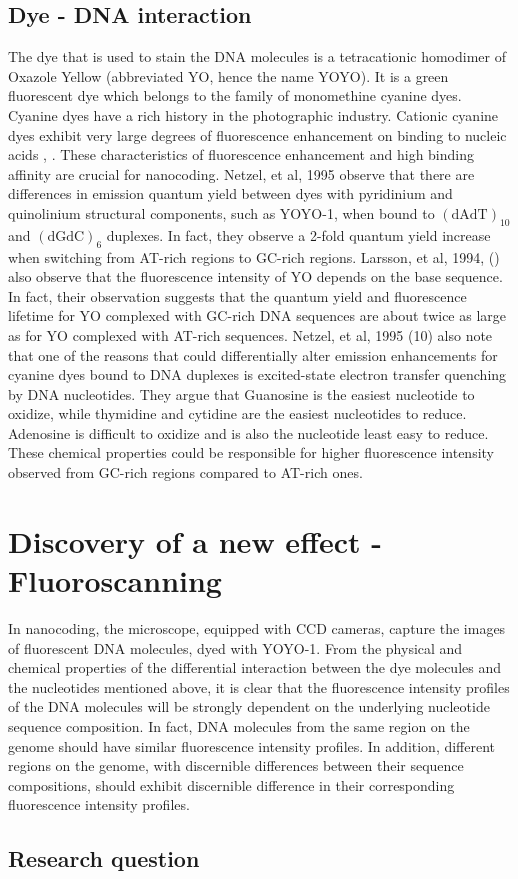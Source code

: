 \subsection*{Dye - DNA interaction} 
The dye that is used to stain the DNA molecules is a tetracationic homodimer of Oxazole Yellow (abbreviated YO, hence the name YOYO). It is a green fluorescent dye which belongs to the family of monomethine cyanine dyes. Cyanine dyes have a rich history in the photographic industry. Cationic  cyanine dyes  exhibit very large degrees of fluorescence enhancement on binding to nucleic acids \cite{Rye_etal_1992_NAR}, \cite{Lee_etal_1986_Cytometry}. These  characteristics of fluorescence enhancement and  high binding affinity are crucial for nanocoding. Netzel, et al, 1995 \cite{Netzel_etal_1995_JPC} observe that there are differences in emission quantum yield between dyes with pyridinium and quinolinium structural components, such as YOYO-1, when bound to $(\text{dAdT})_{10}$ and $(\text{dGdC})_6$ duplexes. In fact, they observe a 2-fold quantum yield increase when switching from AT-rich regions to GC-rich regions. Larsson, et al, 1994, (\cite{Larsson_etal_1994_JACS}) also observe that the fluorescence intensity of YO depends on the base sequence. In fact, their observation suggests that the quantum yield and fluorescence lifetime for YO complexed with GC-rich DNA sequences are about twice as large as for YO complexed with AT-rich sequences. Netzel, et al, 1995 (10) also note that one of the reasons that could differentially alter emission enhancements for cyanine dyes bound to DNA  duplexes is excited-state electron transfer quenching by DNA nucleotides. They argue that Guanosine is the easiest nucleotide to oxidize, while thymidine and cytidine are the easiest nucleotides to reduce. Adenosine is difficult to oxidize and is also the nucleotide least easy to reduce. These chemical properties could be responsible for higher fluorescence intensity observed from GC-rich regions compared to AT-rich ones. 

\section{Discovery of a new effect - Fluoroscanning}
In nanocoding, the microscope, equipped with CCD cameras, capture the images of fluorescent DNA molecules, dyed with YOYO-1. From the physical and chemical properties of the differential interaction between the dye molecules and the nucleotides mentioned above, it is clear that the fluorescence intensity profiles of the DNA molecules will be strongly dependent on the underlying nucleotide sequence composition. In fact, DNA molecules from the same region on the genome should have similar  fluorescence intensity profiles. In addition, different regions on the genome, with discernible differences between their sequence compositions, should exhibit discernible difference in their corresponding  fluorescence intensity profiles. \\

\subsection*{Research question}

